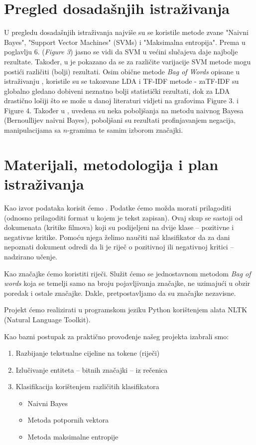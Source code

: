 \documentclass[12pt,a4paper,titlepage]{article}
\begin{document}
\section{Pregled dosadašnjih istraživanja}

U pregledu dosadašnjih istraživanja najviše su se koristile metode zvane "Naivni Bayes", "Support Vector Machines" (\textsc{SVM}s) i "Maksimalna entropija". Prema \cite{Pang:2002:TUS:1118693.1118704} u poglavlju 6. (\textit{Figure 3}) jasno se vidi da \textsc{SVM} u većini slučajeva daje najbolje rezultate. Također, u \cite{stan} je pokazano da se za različite varijacije \textsc{SVM} metode mogu postići različiti (bolji) rezultati. Osim obične metode \textit{Bag of Words} opisane u istraživanju \cite{maas-EtAl:2011:ACL-HLT2011}, koristile su se takozvane \textsc{LDA} i \textsc{TF-IDF} metode - za\textsc{TF-IDF} su globalno gledano dobiveni neznatno bolji statistički rezultati, dok za \textsc{LDA} drastično lošiji što se može u danoj literaturi vidjeti na grafovima Figure 3. i Figure 4. Također u \cite{SaLAD:LAS}, uvedena su neka poboljšanja na metodu naivnog Bayesa (Bernoullijev naivni Bayes), poboljšani su rezultati profinjavanjem negacija, manipulacijama sa $n$-gramima te samim izborom značajki.

\section{Materijali, metodologija i plan istraživanja}

Kao izvor podataka korisit ćemo \cite{dataset}. Podatke ćemo možda morati prilagoditi (odnosno prilagoditi format u kojem je tekst zapisan). Ovaj skup se sastoji od dokumenata (kritike filmova) koji su podijeljeni na dvije klase -- pozitivne i negativne kritike. Pomoću njega želimo naučiti naš klasifikator da za dani nepoznati dokument odredi da li je riječ o pozitivnoj ili negativnoj kritici -- nadzirano učenje.

Kao značajke ćemo koristiti riječi. Služit ćemo se jednostavnom metodom \textit{Bag of words} koja se temelji samo na broju pojavljivanja značajke, ne uzimajući u obzir poredak i ostale značajke. Dakle, pretpostavljamo da su značajke nezavisne.

Projekt ćemo realizirati u programskom jeziku Python korištenjem alata NLTK (Natural Language Toolkit). 

Kao bazni postupak za praktično provođenje našeg projekta izabrali smo:

\begin{enumerate}
  \item Razbijanje tekstualne cijeline na tokene (riječi)
  \item Izlučivanje entiteta -- bitnih značajki -- iz rečenica
  \item Klasifikacija korištenjem različitih klasifikatora
  \begin{itemize}
    \item Naivni Bayes
    \item Metoda potpornih vektora
    \item Metoda maksimalne entropije
  \end{itemize}
\end{enumerate}
\end{document}
